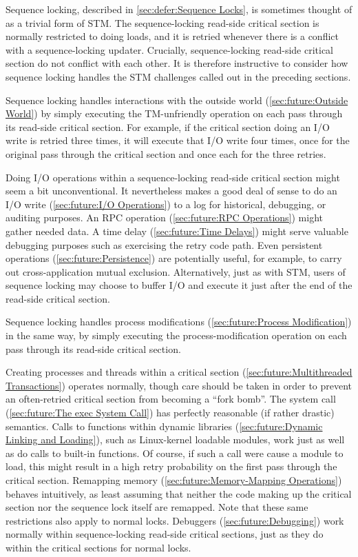 Sequence locking, described in
\cref{sec:defer:Sequence Locks},
is sometimes thought of as a trivial form of STM\@.
The sequence-locking read-side critical section is normally restricted
to doing loads, and it is retried whenever there is a conflict with a
sequence-locking updater.
Crucially, sequence-locking read-side critical section do not conflict
with each other.
It is therefore instructive to consider how sequence locking handles
the STM challenges called out in the preceding sections.

Sequence locking handles interactions with the outside world
(\cref{sec:future:Outside World}) by simply executing the
TM-unfriendly operation on each pass through its read-side
critical section.
For example, if the critical section doing an I/O write
is retried three times, it will execute that I/O write four
times, once for the original pass through the critical
section and once each for the three retries.

Doing I/O operations within a sequence-locking read-side
critical section might seem a bit unconventional.
It nevertheless makes a good deal of sense to do
an I/O write (\cref{sec:future:I/O Operations})
to a log for historical, debugging, or auditing purposes.
An RPC operation (\cref{sec:future:RPC Operations}) might gather needed data.
A time delay (\cref{sec:future:Time Delays}) might serve valuable
debugging purposes such as exercising the retry code path.
Even persistent operations (\cref{sec:future:Persistence}) are potentially
useful, for example, to carry out cross-application mutual exclusion.
Alternatively, just as with STM, users of sequence locking may choose
to buffer I/O and execute it just after the end of the read-side critical
section.

Sequence locking handles process modifications
(\cref{sec:future:Process Modification})
in the same way, by simply executing the process-modification operation
on each pass through its read-side critical section.

Creating processes and threads within a critical section
(\cref{sec:future:Multithreaded Transactions})
operates normally, though care should be taken in order to prevent
an often-retried critical section from becoming a ``fork bomb''.
The  system call (\cref{sec:future:The exec System Call})
has perfectly reasonable (if rather drastic) semantics.
Calls to functions within dynamic libraries
(\cref{sec:future:Dynamic Linking and Loading}),
such as Linux-kernel loadable modules, work just as well as do calls
to built-in functions.
Of course, if such a call were cause a module to load, this might result
in a high retry probability on the first pass through the critical
section.
Remapping memory (\cref{sec:future:Memory-Mapping Operations})
behaves intuitively, as least assuming that neither the code making
up the critical section nor the sequence lock itself are remapped.
Note that these same restrictions also apply to normal locks.
Debuggers (\cref{sec:future:Debugging})
work normally within sequence-locking read-side critical sections,
just as they do within the critical sections for normal locks.

